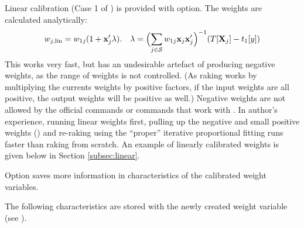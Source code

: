Linear calibration (Case 1 of \citet{deville:sarndal:1992}) is provided with
 option. The weights are calculated analytically:
\begin{equation}
    \label{eq:linear:weight}
    w_{j,\rm{lin}} = w_{1j} (1+\mathbf{x}_j'\mathbf{\lambda}).
    \quad
    \mathbf{\lambda} = \Bigl( \sum_{j \in \mathcal{S}} w_{1j} \mathbf{x}_j \mathbf{x}_j' \Bigr)^{-1}
        ( T [ \mathbf{X}_j  ] - t_{1}[y] )
\end{equation}
This works very fast, but has an undesirable artefact of producing negative weights,
as the range of weights is not controlled. (As raking works by multiplying the currents
weights by positive factors, if the input weights are all positive, the output weights
will be positive as well.) Negative weights are not allowed by the official  commands
or commands that work with \stcmd{[pweights]}.
In author's experience, running linear weights first,
pulling up the negative and small positive weights ()
and re-raking using the ``proper'' iterative proportional fitting runs faster than
raking from scratch. An example of linearly calibrated weights is given below
in Section \ref{subsec:linear}.

Option  saves more information in characteristics of the calibrated
weight variables.

\begin{stlog}
\nullskip
\end{stlog}

The following characteristics are stored with the newly created weight variable
(see ).

